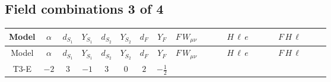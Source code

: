 \documentclass[8pt]{article}
\begin{document}
\begin{landscape}
\subsection*{Field combinations 3 of 4}
\begin{longtable}{@{}cccccccc >{\raggedright\arraybackslash}p{0.21\linewidth} >{\raggedright\arraybackslash}p{0.21\linewidth} >{\raggedright\arraybackslash}p{0.21\linewidth}@{}}
\toprule
Model & $\alpha$ & $d_{S_1}$ & $Y_{S_1}$ & $d_{S_2}$ & $Y_{S_2}$ & $d_F$ & $Y_F$ & $F\,W_{\mu\nu}$ & $H\,\ell\,e$ & $F\,H\,\ell$ \\
\midrule
\endfirsthead
\toprule
Model & $\alpha$ & $d_{S_1}$ & $Y_{S_1}$ & $d_{S_2}$ & $Y_{S_2}$ & $d_F$ & $Y_F$ & $F\,W_{\mu\nu}$ & $H\,\ell\,e$ & $F\,H\,\ell$ \\
\midrule
\endhead
T3-E & $-2$ & $3$ & $-1$ & $3$ & $0$ & $2$ & $-\frac{1}{2}$ & \scriptsize\adjustbox{max width=\linewidth}{$\begin{gathered} -\frac{1}{2} \hbar  \log \left(\frac{\bar{\mu}^{2}}{M_F^2}\right) \left(W_{\mu _1\mu _2}^{A_1}\right){}^2\end{gathered}$} & \scriptsize\adjustbox{max width=\linewidth}{$\begin{gathered} +\frac{\sqrt{3} \hbar  \overline{y_{1,i_3,r_1}} \overline{L_{a_1,i_2}}\, P_R\, e_{i_1} H_{a_1} y_{1,i_2,r_1} Y_{e,i_3,i_1}}{4 \epsilon } \\ -\frac{1}{8} \sqrt{3} \hbar  \overline{y_{1,i_3,r_1}} \overline{L_{a_1,i_2}}\, P_R\, e_{i_1} H_{a_1} y_{1,i_2,r_1} Y_{e,i_3,i_1} \\ +\frac{\sqrt{3} \hbar  \overline{y_{2,i_3,r_1}} \overline{L_{a_1,i_2}}\, P_R\, e_{i_1} H_{a_1} y_{2,i_2,r_1} Y_{e,i_3,i_1}}{4 \epsilon }\end{gathered}$} & \scriptsize\adjustbox{max width=\linewidth}{$\begin{gathered} -\frac{2 \sqrt{\frac{2}{3}} \hbar  \log \left(\frac{M_F^2}{m_2^2}\right) \overline{y_{1,i_1,r_1}} \overline{y_{2,i_2,r_1}} L_{a_4,i_2}{}^T\, C\, P_L\, L_{a_2,i_1} H_{a_1} H_{a_3} m_2^2 \lambda_5 \epsilon_{a_1,a_2} \epsilon_{a_3,a_4} M_F^3}{\left(M_F^2-m_1^2\right) \left(M_F^2-m_2^2\right) \left(m_1^2-m_2^2\right)} \\ +\frac{2 \sqrt{\frac{2}{3}} \hbar  \log \left(\frac{M_F^2}{m_1^2}\right) \overline{y_{1,i_1,r_1}} \overline{y_{2,i_2,r_1}} L_{a_4,i_2}{}^T\, C\, P_L\, L_{a_2,i_1} H_{a_1} H_{a_3} m_1^2 \lambda_5 \epsilon_{a_1,a_2} \epsilon_{a_3,a_4} M_F^3}{\left(M_F^2-m_1^2\right) \left(M_F^2-m_2^2\right) \left(m_1^2-m_2^2\right)} \\ -\frac{2 \sqrt{\frac{2}{3}} \hbar  \log \left(\frac{M_F^2}{m_2^2}\right) \overline{\lambda_5} \overline{L_{a_3,i_1}}\, C\, P_R\, \overline{L_{a_4,i_2}}{}^T m_2^2 y_{1,i_1,r_1} y_{2,i_2,r_1} \epsilon_{a_1,a_3} \epsilon_{a_2,a_4} H_{a_1}{}^{\dagger } H_{a_2}{}^{\dagger } M_F^3}{\left(M_F^2-m_1^2\right) \left(M_F^2-m_2^2\right) \left(m_1^2-m_2^2\right)}\end{gathered}$} \\

\end{longtable}
\end{landscape}
\end{document}
